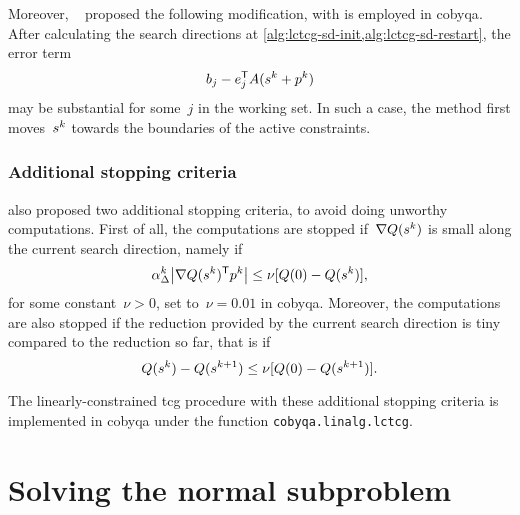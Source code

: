 Moreover, \citeauthor{Powell_2015}~\cite{Powell_2015} proposed the following modification, with is employed in \gls{cobyqa}.
After calculating the search directions at \cref{alg:lctcg-sd-init,alg:lctcg-sd-restart}, the error term
\begin{equation*}
    b_j - e_j^{\T} A(\sstep[k] + \pstep[k])
\end{equation*}
may be substantial for some~$j$ in the working set.
In such a case, the method first moves~$\sstep[k]$ towards the boundaries of the active constraints.

\subsubsection{Additional stopping criteria}

 also proposed two additional stopping criteria, to avoid doing unworthy computations.
First of all, the computations are stopped if~$\nabla Q(\sstep[k])$ is small along the current search direction, namely if
\begin{equation*}
    \alpha_{\rad}^k \abs[\big]{\nabla Q(\sstep[k])^{\T} \pstep[k]} \le \nu [Q(0) - Q(\sstep[k])],
\end{equation*}
for some constant~$\nu > 0$, set to~$\nu = 0.01$ in \gls{cobyqa}.
Moreover, the computations are also stopped if the reduction provided by the current search direction is tiny compared to the reduction so far, that is if
\begin{equation*}
    Q(\sstep[k]) - Q(\sstep[k + 1]) \le \nu [Q(0) - Q(\sstep[k + 1])].
\end{equation*}

The linearly-constrained \gls{tcg} procedure with these additional stopping criteria is implemented in \gls{cobyqa} under the function \texttt{cobyqa.linalg.lctcg}.

\section{Solving the normal subproblem}
\label{sec:cobyqa-normal}

